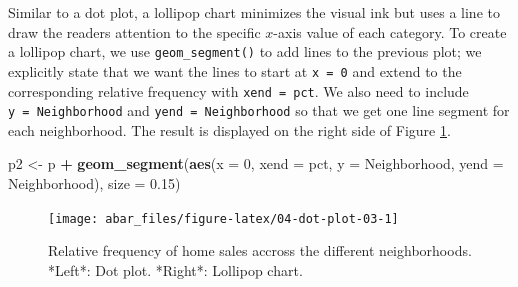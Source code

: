 \documentclass[]{book}
\newenvironment{Shaded}{\begin{snugshade}}{\end{snugshade}}
\newcommand{\DataTypeTok}[1]{\textcolor[rgb]{0.13,0.29,0.53}{#1}}
\newcommand{\DecValTok}[1]{\textcolor[rgb]{0.00,0.00,0.81}{#1}}
\newcommand{\FloatTok}[1]{\textcolor[rgb]{0.00,0.00,0.81}{#1}}
\newcommand{\KeywordTok}[1]{\textcolor[rgb]{0.13,0.29,0.53}{\textbf{#1}}}
\newcommand{\NormalTok}[1]{#1}
\newcommand{\OperatorTok}[1]{\textcolor[rgb]{0.81,0.36,0.00}{\textbf{#1}}}
\newcommand{\StringTok}[1]{\textcolor[rgb]{0.31,0.60,0.02}{#1}}
\theoremstyle{definition}
\theoremstyle{definition}
\theoremstyle{definition}
\theoremstyle{remark}
\begin{document}
\begin{Shaded}
\end{Shaded}

Similar to a dot plot, a lollipop chart minimizes the visual ink but
uses a line to draw the readers attention to the specific \(x\)-axis
value of each category. To create a lollipop chart, we use
\texttt{geom\_segment()} to add lines to the previous plot; we
explicitly state that we want the lines to start at \texttt{x\ =\ 0} and
extend to the corresponding relative frequency with
\texttt{xend\ =\ pct}. We also need to include
\texttt{y\ =\ Neighborhood} and \texttt{yend\ =\ Neighborhood} so that
we get one line segment for each neighborhood. The result is displayed
on the right side of Figure \ref{fig:04-dot-plot-03}.

\begin{Shaded}
\begin{Highlighting}[]
\NormalTok{p2 <-}\StringTok{ }\NormalTok{p }\OperatorTok{+}\StringTok{ }
\StringTok{  }\KeywordTok{geom_segment}\NormalTok{(}\KeywordTok{aes}\NormalTok{(}\DataTypeTok{x =} \DecValTok{0}\NormalTok{, }\DataTypeTok{xend =}\NormalTok{ pct, }\DataTypeTok{y =}\NormalTok{ Neighborhood, }\DataTypeTok{yend =}\NormalTok{ Neighborhood),}
               \DataTypeTok{size =} \FloatTok{0.15}\NormalTok{)}
\end{Highlighting}
\end{Shaded}

\begin{figure}

{\centering \texttt{[image: abar\_files/figure-latex/04-dot-plot-03-1]} 

}

\caption{Relative frequency of home sales accross the different neighborhoods. *Left*: Dot plot. *Right*: Lollipop chart.}\label{fig:04-dot-plot-03}
\end{figure}
\end{document}
